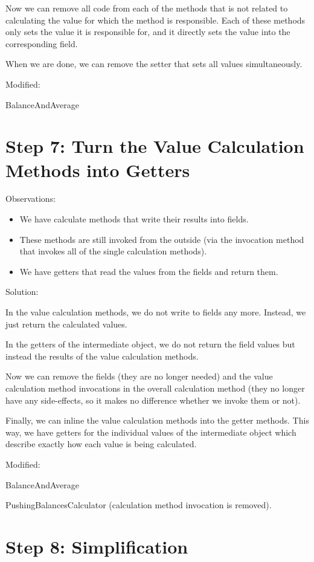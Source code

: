 \documentclass[a4paper,fleqn,titlepage,11pt]{article}
\begin{document}
Now we can remove all code from each of the methods that is not related to calculating the value for which the method is responsible. Each of these methods only sets the value it is responsible for, and it directly sets the value into the corresponding field.

When we are done, we can remove the setter that sets all values simultaneously.

Modified:

BalanceAndAverage

\section{Step 7: Turn the Value Calculation Methods into Getters}

Observations:
\begin{itemize}
\item We have calculate methods that write their results into fields.
\item These methods are still invoked from the outside (via the invocation method that invokes all of the single calculation methods).
\item We have getters that read the values from the fields and return them.
\end{itemize}

Solution:

In the value calculation methods, we do not write to fields any more. Instead, we just return the calculated values.

In the getters of the intermediate object, we do not return the field values but instead the results of the value calculation methods.

Now we can remove the fields (they are no longer needed) and the value calculation method invocations in the overall calculation method (they no longer have any side-effects, so it makes no difference whether we invoke them or not).

Finally, we can inline the value calculation methods into the getter methods. This way, we have getters for the individual values of the intermediate object which describe exactly how each value is being calculated.

Modified:

BalanceAndAverage

PushingBalancesCalculator (calculation method invocation is removed).

\section{Step 8: Simplification}
\end{document}
